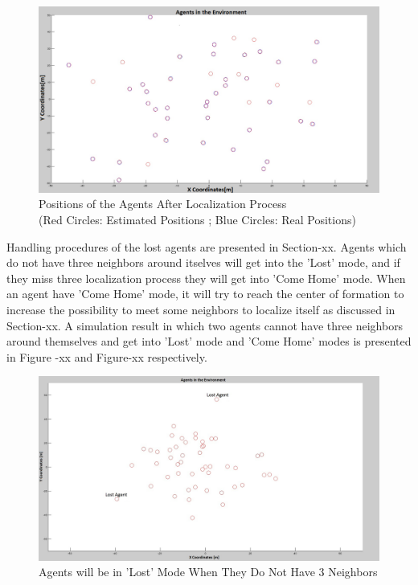\documentclass[twoside]{article}
\begin{document}
		
			\begin{figure}[H]
				\caption{Positions of the Agents After Localization Process \\
					(Red Circles: Estimated Positions ; Blue Circles: Real Positions)}
				\centerline{\includegraphics[scale = 0.30]{Pozisyon-1-Duzeltilmis}}
			\end{figure} 
		
		Handling procedures of the lost agents are presented in Section-xx. Agents which do not have three neighbors around itselves will get into the 'Lost' mode, and if  they miss three localization process they will get into 'Come Home' mode. When an agent have 'Come Home' mode, it will try to reach the center of formation to increase the possibility to meet some neighbors to localize itself as discussed in Section-xx. A simulation result in which two agents cannot have three neighbors around themselves and get into 'Lost' mode and 'Come Home' modes  is presented in Figure -xx and Figure-xx respectively.
		
			\begin{figure}[H]
				\caption{Agents will be in 'Lost' Mode When They Do Not Have 3 Neighbors}
				\centerline{\includegraphics[scale = 0.30]{Lost-2-2}}
			\end{figure} 
\end{document}
